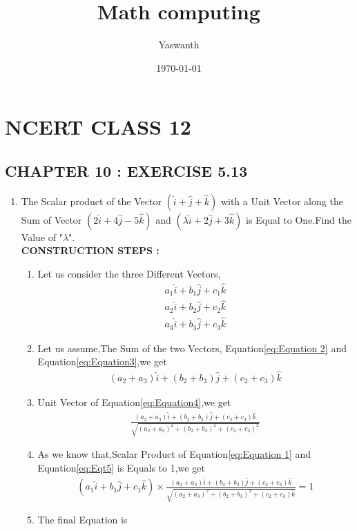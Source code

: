 \documentclass[11pt, a4paper]{article}
\title{ Math computing}
\author{ Yaswanth }
\date{\today}
\begin{document}
\section*{NCERT CLASS 12}
\subsection*{CHAPTER 10 : EXERCISE 5.13}
\begin{enumerate}
\item The Scalar product of the Vector $(\hat{i}+\hat{j}+\hat{k})$ with a Unit Vector along the Sum of Vector $(2\hat{i}+4\hat{j}-5\hat{k})$ and $(\lambda \hat{i}+2\hat{j}+3\hat{k})$ is Equal to One.Find the Value of "$\lambda$". 
\\

\textbf{CONSTRUCTION STEPS :}
\begin{enumerate}
    \item Let us consider the three Different Vectors,
    \begin{align}
        a_1\hat{i}+b_1\hat{j}+c_1\hat{k} \label{eq:Equation 1}\\
                a_2\hat{i}+b_2\hat{j}+c_2\hat{k} \label{eq:Equation 2}\\
        a_3\hat{i}+b_3\hat{j}+c_3\hat{k} \label{eq:Equation3}
    \end{align}
     \item Let us assume,The Sum of the two Vectors, Equation\eqref{eq:Equation 2} and Equation\eqref{eq:Equation3},we get \begin{align}
         (a_2+a_3)\hat{i}+(b_2+b_3)\hat{j}+(c_2+c_3)\hat{k}\label{eq:Equation4}   
         \end{align}
     \item Unit Vector of Equation\eqref{eq:Equation4},we get
      \begin{align}
          \frac{(a_2+a_3)\hat{i}+(b_2+b_3)\hat{j}+(c_2+c_3)\hat{k}}{\sqrt{(a_2+a_3)^2+(b_2+b_3)^2+(c_2+c_3)^2}} \label{eq:Eqt5}
      \end{align}
      \item As we know that,Scalar Product of Equation\eqref{eq:Equation 1} and Equation\eqref{eq:Eqt5} is Equals to 1,we get
      \begin{align}
          (a_1\hat{i}+b_1\hat{j}+c_1\hat{k})\times\frac{(a_2+a_3)\hat{i}+(b_2+b_3)\hat{j}+(c_2+c_3)\hat{k}}{\sqrt{(a_2+a_3)^2+(b_2+b_3)^2+(c_2+c_3)\hat{k}}} = 1\label{eq:Eqt6}
      \end{align}
      \item The final Equation is 

\end{enumerate}
\end{enumerate}
\end{document}
